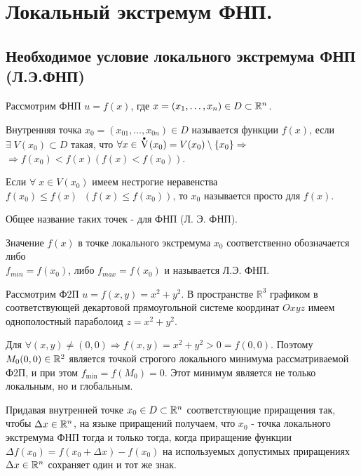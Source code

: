 \section{Локальный экстремум ФНП.}

\subsection{Необходимое условие локального экстремума ФНП (Л.Э.ФНП)}

Рассмотрим ФНП $ u = f(x) $, где $ x = (x_1, \ldots , x_n) \in D \subset \mathbb{R}^n $.

Внутренняя точка ${ x_0 = (x_{01}, \ldots , x_{0n}) \in D }$ называется
 функции $ f(x) $, если
$ \exists \; V(x_0) \subset D $ такая, что
$ \forall x \in \text{$\overset{\text{ }_\bullet\text{ }}{\text{V}}$}(x_0) = V(x_0) \setminus \{x_0\} \Rightarrow $
$ \Rightarrow f(x_0) < f(x) ( f(x) < f(x_0) ) $.

Если $ \forall \; x \in V(x_0) $ имеем нестрогие неравенства $ f(x_0) \leqslant f(x) \;\; (f(x) \leqslant f(x_0)) $, то $ x_0 $ называется просто
 для $ f(x) $.

Общее название таких точек -  для ФНП (Л. Э. ФНП).

Значение $ f(x) $ в точке локального экстремума $ x_0 $ соответственно обозначается либо\\
${ f_{min} = f(x_0) }$, либо $ f_{max} = f(x_0) $ и называется  Л.Э. ФНП.

\begin{example}
    Рассмотрим Ф2П $ u = f(x, y) = x^2 + y^2 $.
    В пространстве $ \mathbb{R}^3 $ графиком  в соответствующей декартовой прямоугольной системе координат $ Oxyz $ имеем однополостный параболоид $ z = x^2 + y^2 $.

		Для $ \forall (x, y) \neq (0, 0) \Rightarrow f(x, y) = x^2 + y^2 > 0 = f(0, 0). $
	Поэтому $M_0(0, 0) \in \mathbb{R}^{2}$ является точкой строгого локального минимума рассматриваемой Ф2П, и
	при этом $f_{\min} = f(M_0) = 0$. Этот минимум является не только локальным, но и глобальным.
\end{example}

Придавая внутренней точке $x_0 \in D \subset \mathbb{R}^{n}$ соответствующие приращения так, чтобы $\Delta{x} \in \mathbb{R}^n$,
на языке приращений
получаем, что $x_0$ - точка локального экстремума ФНП тогда и только тогда, когда приращение функции
$\Delta{f(x_0)} = f(x_0 + \Delta{x}) - f(x_0)$ на используемых допустимых приращениях $\Delta{x} \in \mathbb{R}^{n}$
сохраняет один и тот же знак. 

